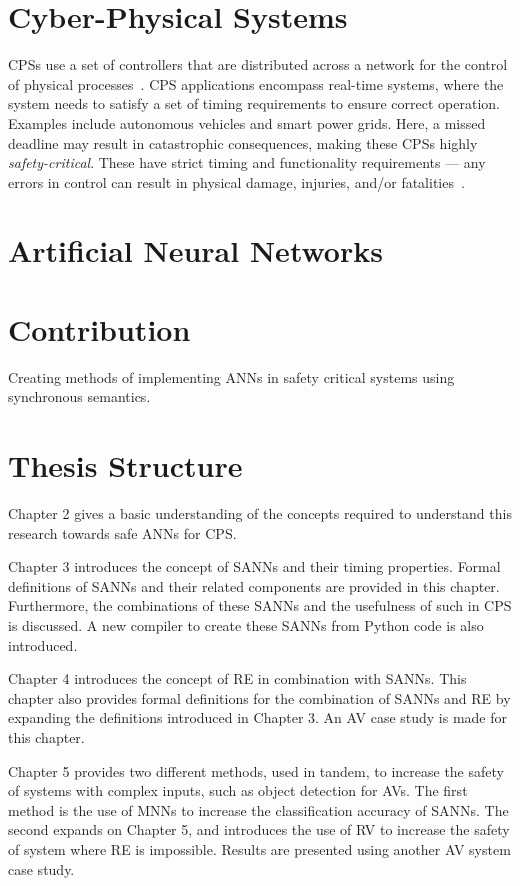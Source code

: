 \section{Cyber-Physical Systems}
\acp{CPS} use a set of controllers that are distributed across a network for the 
control of physical processes~\cite{alur2015principles}. \ac{CPS} applications encompass real-time systems, where 
the system needs to satisfy a set of timing requirements to ensure correct operation. Examples include autonomous vehicles and
smart power grids. Here, a missed deadline may result in catastrophic consequences, making these \acp{CPS} highly 
\textit{safety-critical}. 
These have strict timing and functionality requirements --- any errors in control can result in physical damage, injuries, and/or fatalities~\cite{ANNDevModel1999}. 

\section{Artificial Neural Networks}


\section{Contribution}
Creating methods of implementing ANNs in safety critical systems using synchronous semantics.

\section{Thesis Structure}
Chapter 2 gives a basic understanding of the concepts required to understand this research towards safe \acp{ANN} for \ac{CPS}.

Chapter 3 introduces the concept of \acfp{SANN} and their timing properties.
Formal definitions of \acp{SANN} and their related components are provided in this chapter.
Furthermore, the combinations of these \acp{SANN} and the usefulness of such in \ac{CPS} is discussed.
A new compiler to create these \acp{SANN} from Python code is also introduced.

Chapter 4 introduces the concept of \acf{RE} in combination with \acp{SANN}. 
This chapter also provides formal definitions for the combination of \acp{SANN} and \ac{RE} by expanding the definitions introduced in Chapter 3.
An \acf{AV} case study is made for this chapter.

Chapter 5 provides two different methods, used in tandem, to increase the safety of systems with complex inputs, such as object detection for \acp{AV}.
The first method is the use of \acp{MNN} to increase the classification accuracy of \acp{SANN}.
The second expands on Chapter 5, and introduces the use of \acf{RV} to increase the safety of system where \ac{RE} is impossible.
Results are presented using another \ac{AV} system case study.

